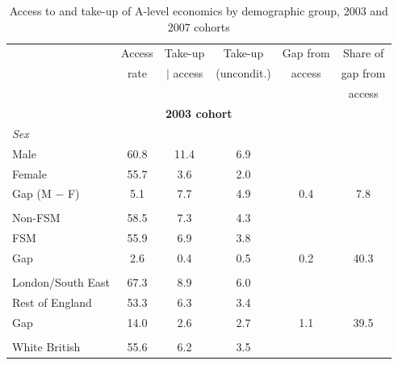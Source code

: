 \begin{table}[htbp]
\centering
\caption{Access to and take-up of A-level economics by demographic group, 2003 and 2007 cohorts}
\label{tab:pref_constraint_earlier}
\begin{tabular}{l ccccc}
\toprule
                              & Access     & Take-up    & Take-up    & Gap from   & Share of   \\
                              & rate       & $|$ access & (uncondit.)& access     & gap from   \\
                              &            &            &            &            & access     \\
\midrule
\multicolumn{6}{c}{\textbf{2003 cohort}} \\
\midrule
\multicolumn{6}{l}{\textit{Sex}} \\
Male                          & 60.8       & 11.4       & 6.9        &            &            \\
Female                        & 55.7       & 3.6        & 2.0        &            &            \\
Gap (M $-$ F)                 & 5.1        & 7.7        & 4.9        & 0.4        & 7.8       \\
\addlinespace
\multicolumn{6}{l}{\textit{Socioeconomic status}} \\
Non-FSM                       & 58.5       & 7.3        & 4.3        &            &            \\
FSM                           & 55.9       & 6.9        & 3.8 &            &            \\
Gap                           & 2.6        & 0.4        & 0.5        & 0.2        & 40.3       \\
\addlinespace
\multicolumn{6}{l}{\textit{Region}} \\
London/South East             & 67.3       & 8.9        & 6.0        &            &            \\
Rest of England               & 53.3       & 6.3        & 3.4        &            &            \\
Gap                           & 14.0       & 2.6        & 2.7        &  1.1       & 39.5       \\
\addlinespace
\multicolumn{6}{l}{\textit{Ethnicity}} \\
White British                 & 55.6       & 6.2        & 3.5        &            &            \\

\end{tabular}
\end{table}
